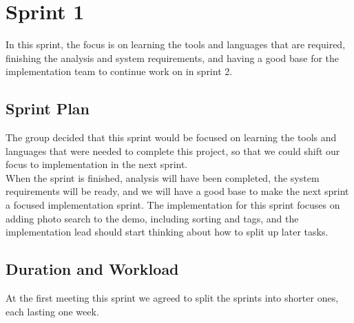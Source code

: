 \chapter{Sprint 1}
\label{chap:S1}
In this sprint, the focus is on learning the tools and languages that are required, finishing the analysis and system requirements, and having a good base for the implementation team to continue work on in sprint 2.

\section{Sprint Plan}
\label{sec:S1Planning}
The group decided that this sprint would be focused on learning the tools and languages that were needed to complete this project, so that we could shift our focus to implementation in the next sprint. \\
\indent When the sprint is finished, analysis will have been completed, the system requirements will be ready, and we will have a good base to make the next sprint a focused implementation sprint. The implementation for this sprint focuses on adding photo search to the demo, including sorting and tags, and the implementation lead should start thinking about how to split up later tasks.

\section{Duration and Workload}
\label{sec:S1DurationWorkload}
At the first meeting this sprint we agreed to split the sprints into shorter ones, each lasting one week. \\


